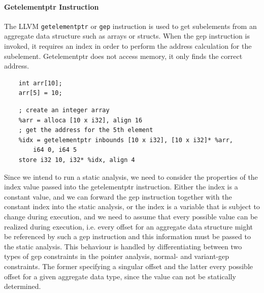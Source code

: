 \paragraph{Getelementptr Instruction}
The LLVM \verb|getelementptr| or \verb|gep| instruction is used to get subelements from an aggregate data structure such as arrays or structs. When the gep instruction is invoked, it requires an index in order to perform the address calculation for the subelement. Getelementptr does not access memory, it only finds the correct address.
\begin{verbatim}
    int arr[10];
    arr[5] = 10;
\end{verbatim}
\begin{verbatim}
    ; create an integer array
    %arr = alloca [10 x i32], align 16
    ; get the address for the 5th element
    %idx = getelementptr inbounds [10 x i32], [10 x i32]* %arr, 
        i64 0, i64 5
    store i32 10, i32* %idx, align 4
\end{verbatim}
Since we intend to run a static analysis, we need to consider the properties of the index value passed into the getelementptr instruction.
Either the index is a constant value, and we can forward the gep instruction together with the constant index into the static analysis,
or the index is a variable that is subject to change during execution, and we need to assume that every possible value can be realized during execution, i.e. every offset for an aggregate data structure might be referenced by such a gep instruction and this information must be passed to the static analysis.
This behaviour is handled by differentiating between two types of gep constraints in the pointer analysis, normal- and variant-gep constraints. The former specifying a singular offset and the latter every possible offset for a given aggregate data type, since the value can not be statically determined.

